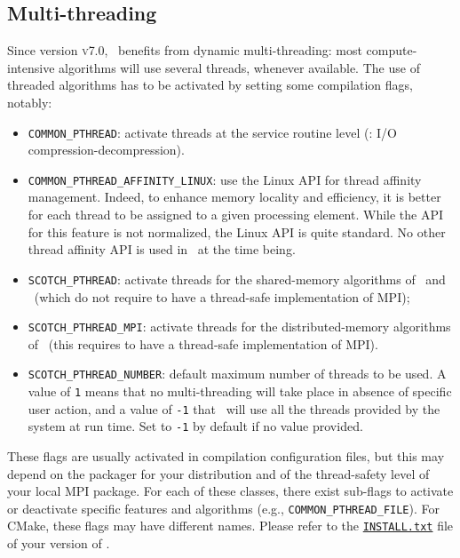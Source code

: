 \begin{center}
\end{center}

\subsection{Multi-threading}

Since version \textsc{v7.0}, \scotch\ benefits from dynamic
multi-threading: most compute-intensive algorithms will use several
threads, whenever available. The use of threaded algorithms has to be
activated by setting some compilation flags, notably:
\begin{itemize}
\item
\texttt{COMMON\_PTHREAD}: activate threads at the service routine
level (\eg: I/O compression-decompression).
\item
\texttt{COMMON\_\lbt PTHREAD\_\lbt AFFINITY\_\lbt LINUX}: use
the Linux API for thread affinity management. Indeed, to enhance
memory locality and efficiency, it is better for each thread to be
assigned to a given processing element. While the API for this feature
is not normalized, the Linux API is quite standard. No other thread
affinity API is used in \scotch\ at the time being.
\item
\texttt{SCOTCH\_PTHREAD}: activate threads for the shared-memory
algorithms of \scotch\ and \ptscotch\ (which do not require to have
a thread-safe implementation of MPI);
\item
\texttt{SCOTCH\_PTHREAD\_MPI}: activate threads for the
distributed-memory algorithms of \ptscotch\ (this requires to have
a thread-safe implementation of MPI).
\item
\texttt{SCOTCH\_PTHREAD\_NUMBER}: default maximum number of threads to
be used. A value of \texttt{1} means that no multi-threading will take
place in absence of specific user action, and a value of \texttt{-1}
that \scotch\ will use all the threads provided by the system at run
time. Set to \texttt{-1} by default if no value provided.
\end{itemize}
These flags are usually activated in compilation configuration files,
but this may depend on the packager for your distribution and of the
thread-safety level of your local MPI package. For each of these
classes, there exist sub-flags to activate or deactivate specific
features and algorithms (e.g.,
\texttt{COMMON\_\lbt PTHREAD\_\lbt FILE}). For CMake, these flags may
have different names. Please refer to the
\href{https://gitlab.inria.fr/scotch/scotch/-/blob/master/INSTALL.txt}{\texttt{INSTALL.txt}}
file of your version of \scotch.

